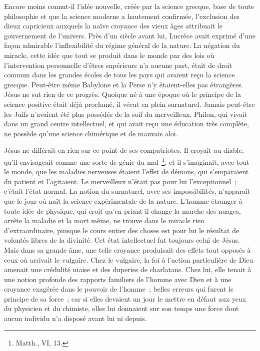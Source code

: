\documentclass[french,twoside]{book} %
\begin{document}
Encore moins connut-il l’idée nouvelle, créée par la science grecque, base de toute philosophie et que la science moderne a hautement confirmée, l’exclusion des dieux capricieux auxquels la naïve croyance des vieux âges attribuait le gouvernement de l’univers. Près d’un siècle avant lui, Lucrèce avait exprimé d’une façon admirable l’inflexibilité du régime général de la nature. La négation du miracle, cette idée que tout se produit dans le monde par des lois où l’intervention personnelle d’êtres supérieurs n’a aucune part, était de droit commun dans les grandes écoles de tous les pays qui avaient reçu la science grecque. Peut-être même Babylone et la Perse n’y étaient-elles pas étrangères. Jésus ne sut rien de ce progrès. Quoique né à une époque où le principe de la science positive était déjà proclamé, il vécut en plein surnaturel. Jamais peut-être les Juifs n’avaient été plus possédés de la soif du merveilleux. Philon, qui vivait dans un grand centre intellectuel, et qui avait reçu une éducation très complète, ne possède qu’une science chimérique et de mauvais aloi.\par
Jésus ne différait en rien sur ce point de ses compatriotes. Il croyait au diable, qu’il envisageait comme une sorte de génie du mal \footnote{Matth., VI, 13.}, et il s’imaginait, avec tout le monde, que les maladies nerveuses étaient l’effet de démons, qui s’emparaient du patient et l’agitaient. Le merveilleux n’était pas pour lui l’exceptionnel ; c’était l’état normal. La notion du surnaturel, avec ses impossibilités, n’apparaît que le jour où naît la science expérimentale de la nature. L’homme étranger à toute idée de physique, qui croit qu’en priant il change la marche des nuages, arrête la maladie et la mort même, ne trouve dans le miracle rien d’extraordinaire, puisque le cours entier des choses est pour lui le résultat de volontés libres de la divinité. Cet état intellectuel fut toujours celui de Jésus. Mais dans sa grande âme, une telle croyance produisait des effets tout opposés à ceux où arrivait le vulgaire. Chez le vulgaire, la foi à l’action particulière de Dieu amenait une crédulité niaise et des duperies de charlatans. Chez lui, elle tenait à une notion profonde des rapports familiers de l’homme avec Dieu et à une croyance exagérée dans le pouvoir de l’homme ; belles erreurs qui furent le principe de sa force ; car si elles devaient un jour le mettre en défaut aux yeux du physicien et du chimiste, elles lui donnaient sur son temps une force dont aucun individu n’a disposé avant lui ni depuis.\par
\end{document}

